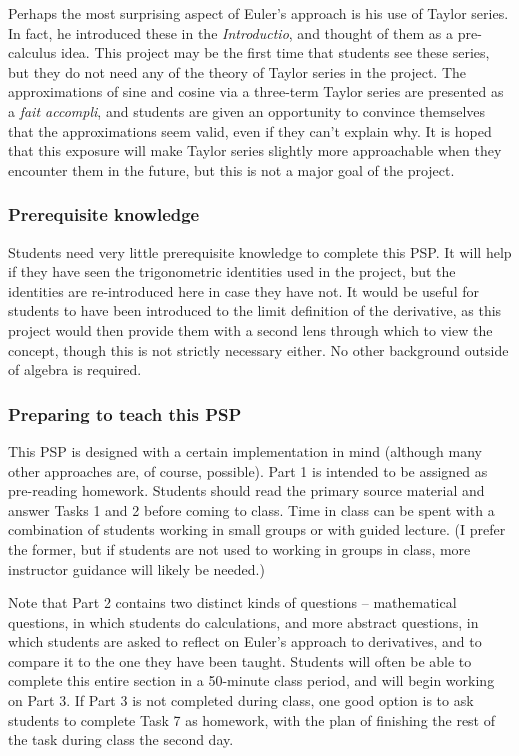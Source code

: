 \documentclass[11pt]{article}
\begin{document}
Perhaps the most surprising aspect of Euler's approach is his use of Taylor series. In fact, he introduced these in the \emph{Introductio}, and thought of them as a pre-calculus idea.  This project may be the first time that students see these series, but they do not need any of the theory of Taylor series in the project.  The approximations of sine and cosine via a three-term Taylor series are presented as a \emph{fait accompli}, and students are given an opportunity to convince themselves that the approximations seem valid, even if they can't explain why.  It is hoped that this exposure will make Taylor series slightly more approachable when they encounter them in the future, but this is not a major goal of the project.

\subsubsection*{Prerequisite knowledge}

Students need very little prerequisite knowledge to complete this PSP.  It will help if they have seen the trigonometric identities used in the project, but the identities are re-introduced here in case they have not.  It would be useful for students to have been introduced to the limit definition of the derivative, as this project would then provide them with a second lens through which to view the concept, though this is not strictly necessary either.  No other background outside of algebra is required.

\subsubsection*{Preparing to teach this PSP}

This PSP is designed with a certain implementation in mind (although many other approaches are, of course, possible). Part 1 is intended to be assigned as pre-reading homework.  Students should read the primary source material and answer Tasks 1 and 2 before coming to class.  Time in class can be spent with a combination of students working in small groups or with guided lecture. (I prefer the former, but if students are not used to working in groups in class, more instructor guidance will likely be needed.)

Note that Part 2 contains two distinct kinds of questions -- mathematical questions, in which students do calculations, and more abstract questions, in which students are asked to reflect on Euler's approach to derivatives, and to compare it to the one they have been taught.  Students will often be able to complete this entire section in a 50-minute class period, and will begin working on Part 3.  If Part 3 is not completed during class, one good option is to ask students to complete Task 7 as homework, with the plan of finishing the rest of the task during class the second day.
\end{document}
